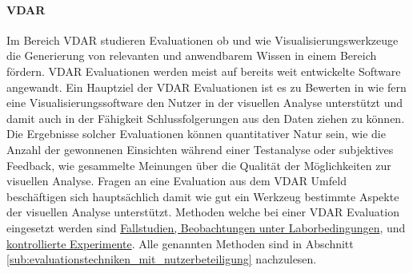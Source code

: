 \documentclass[draft=false
              ,paper=a4
              ,twoside=false
              ,fontsize=11pt
              ,headsepline
              ,BCOR10mm
              ,DIV11
              ]{scrbook}
\begin{document}
\paragraph{VDAR} %
\label{par:vdar}
Im Bereich VDAR studieren Evaluationen ob und wie Visualisierungswerkzeuge die Generierung von relevanten und anwendbarem Wissen in einem Bereich fördern. VDAR Evaluationen werden meist auf bereits weit entwickelte Software angewandt. Ein Hauptziel der VDAR Evaluationen ist es zu Bewerten in wie fern eine Visualisierungssoftware den Nutzer in der visuellen Analyse unterstützt und damit auch in der Fähigkeit Schlussfolgerungen aus den Daten ziehen zu können. Die Ergebnisse solcher Evaluationen können quantitativer Natur sein, wie die Anzahl der gewonnenen Einsichten während einer Testanalyse oder subjektives Feedback, wie gesammelte Meinungen über die Qualität der Möglichkeiten zur visuellen Analyse. Fragen an eine Evaluation aus dem VDAR Umfeld beschäftigen sich hauptsächlich damit wie gut ein Werkzeug bestimmte Aspekte der visuellen Analyse unterstützt. Methoden welche bei einer VDAR Evaluation eingesetzt werden sind \hyperref[ssub:techniken_auf_grundlage_von_beobachtungen]{Fallstudien, Beobachtungen unter Laborbedingungen},  und \hyperref[ssub:empirische_techniken_auf_grundlage_von_experimenten]{kontrollierte Experimente}. Alle genannten Methoden sind in Abschnitt \ref{sub:evaluationstechniken_mit_nutzerbeteiligung} nachzulesen.
\end{document}
